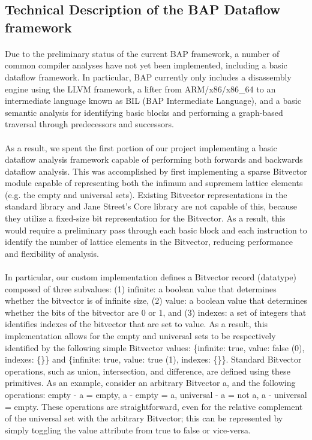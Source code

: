 \documentclass[letterpaper,11pt]{article}
\begin{document}
\subsection{Technical Description of the BAP Dataflow framework}

\paragraph{}
Due to the preliminary status of the current BAP framework, a number of common
compiler analyses have not yet been implemented, including a basic dataflow
framework. In particular, BAP currently only includes a disassembly engine
using the LLVM framework, a lifter from ARM/x86/x86\_64 to an intermediate
language known as BIL (BAP Intermediate Language), and a basic semantic
analysis for identifying basic blocks and performing a graph-based traversal
through predecessors and successors.

\paragraph{}
As a result, we spent the first portion of our project implementing a basic
dataflow analysis framework capable of performing both forwards and backwards
dataflow analysis. This was accomplished by first implementing a sparse
Bitvector module capable of representing both the infimum and supremem lattice
elements (e.g. the empty and universal sets). Existing Bitvector
representations in the standard library and Jane Street’s Core library are not
capable of this, because they utilize a fixed-size bit representation for the
Bitvector. As a result, this would require a preliminary pass through each
basic block and each instruction to identify the number of lattice elements in
the Bitvector, reducing performance and flexibility of analysis.

\paragraph{}
In particular, our custom implementation defines a Bitvector record (datatype)
composed of three subvalues: (1) infinite: a boolean value that determines
whether the bitvector is of infinite size, (2) value: a boolean value that
determines whether the bits of the bitvector are 0 or 1, and (3) indexes: a set
of integers that identifies indexes of the bitvector that are set to value. As
a result, this implementation allows for the empty and universal sets to be
respectively identified by the following simple Bitvector values: \{infinite:
true, value: false (0), indexes: \{\}\} and \{infinite: true, value: true (1),
indexes: \{\}\}. Standard Bitvector operations, such as union, intersection, and
difference, are defined using these primitives. As an example, consider an
arbitrary Bitvector a, and the following operations: empty - a = empty, a -
empty = a, universal - a = not a, a - universal = empty. These operations are
straightforward, even for the relative complement of the universal set with the
arbitrary Bitvector; this can be represented by simply toggling the value
attribute from true to false or vice-versa. 
\end{document}

